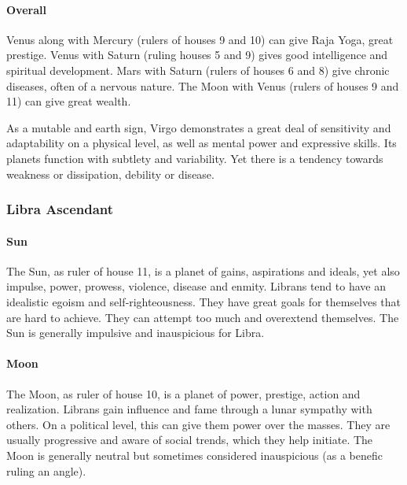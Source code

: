  

\paragraph{Overall}

Venus along with Mercury (rulers of houses 9 and 10) can give Raja Yoga, great prestige. Venus with Saturn (ruling houses 5 and 9) gives good intelligence and spiritual development. Mars with Saturn (rulers of houses 6 and 8) give chronic diseases, often of a nervous nature. The Moon with Venus (rulers of houses 9 and 11) can give great wealth.

 

As a mutable and earth sign, Virgo demonstrates a great deal of sensitivity and adaptability on a physical level, as well as mental power and expressive skills. Its planets function with subtlety and variability. Yet there is a tendency towards weakness or dissipation, debility or disease.

 

\subsubsection{Libra Ascendant}
 

\paragraph{Sun}

The Sun, as ruler of house 11, is a planet of gains, aspirations and ideals, yet also impulse, power, prowess, violence, disease and enmity.  Librans tend to have an idealistic egoism and self‑righteousness. They have great goals for themselves that are hard to achieve. They can attempt too much and overextend themselves. The Sun is generally impulsive and inauspicious for Libra.

 

\paragraph{Moon}

The Moon, as ruler of house 10, is a planet of power, prestige, action and realization. Librans gain influence and fame through a lunar sympathy with others. On a political level, this can give them power over the masses. They are usually progressive and aware of social trends, which they help initiate. The Moon is generally neutral but sometimes considered inauspicious (as a benefic ruling an angle).

